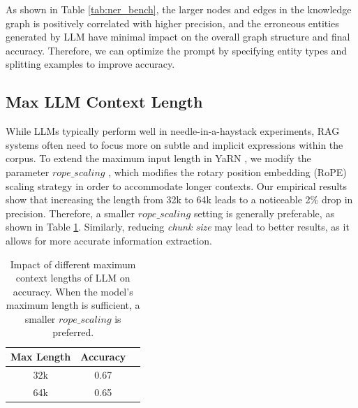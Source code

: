 \documentclass[11pt]{article}
\begin{document}
As shown in Table \ref{tab:ner_bench}, the larger nodes and edges in the knowledge graph is positively correlated with higher precision, and the erroneous entities generated by LLM have minimal impact on the overall graph structure and final accuracy.  Therefore, we can optimize the prompt by specifying entity types and splitting examples to improve accuracy. 



\subsection{Max LLM Context Length}
While LLMs typically perform well in needle-in-a-haystack experiments, RAG systems often need to focus more on subtle and implicit expressions within the corpus. To extend the maximum input length in YaRN \cite{peng2023yarn}, we modify the parameter $rope\_scaling$ , which modifies the rotary position embedding (RoPE) scaling strategy in order to accommodate longer contexts. Our empirical results show that increasing the length from 32k to 64k leads to a noticeable 2\% drop in precision. Therefore, a smaller $rope\_scaling$ setting is generally preferable, as shown in Table \ref{tab:llm_bench}. Similarly, reducing \textit{chunk size} may lead to better results, as it allows for more accurate information extraction.

\begin{table}[t]
\centering
\begin{tabular}{ccc}
\hline
\textbf{Max Length} & \textbf{Accuracy} \\\hline
32k & 0.67 \\
64k & 0.65 \\\hline 
\end{tabular}
\caption{Impact of different maximum context lengths of LLM on accuracy. When the model's maximum length is sufficient, a smaller $rope\_scaling$ is preferred.}
\label{tab:llm_bench}
\end{table}
\end{document}
